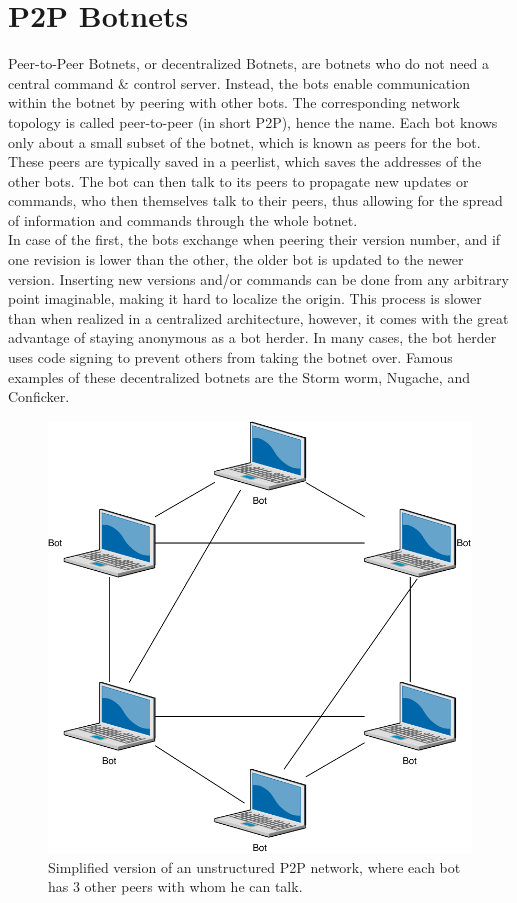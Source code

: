 \documentclass[10pt, a4paper, twocolumn]{article} %
\begin{document}
\section{P2P Botnets}
Peer-to-Peer Botnets, or decentralized Botnets, are botnets who do not need a central command \& control server. Instead, the bots enable communication within the botnet by peering with other bots\cite{enisa}. The corresponding network topology is called peer-to-peer (in short P2P), hence the name. Each bot knows only about a small subset of the botnet, which is known as peers for the bot. These peers are typically saved in a peerlist, which saves the addresses of the other bots. The bot can then talk to its peers to propagate new updates or commands, who then themselves talk to their peers, thus allowing for the spread of information and commands through the whole botnet. \\
In case of the first, the bots exchange when peering their version number, and if one revision is lower than the other, the older bot is updated to the newer version. Inserting new versions and/or commands can be done from any arbitrary point imaginable, making it hard to localize the origin. This process is slower than when realized in a centralized architecture, however, it comes with the great advantage of staying anonymous as a bot herder. In many cases, the bot herder uses code signing to prevent others from taking the botnet over. Famous examples of these decentralized botnets are the Storm worm, Nugache, and Conficker. 
\begin{figure}[ht]
  \centering
  \includegraphics[width=\linewidth]{figures/p2p}
  \caption{Simplified version of an unstructured P2P network, where each bot has 3 other peers with whom he can talk.}
\end{figure} \\
\end{document}
